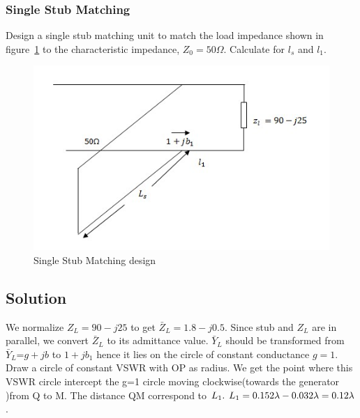 \begin{exmp}
\subsubsection*{Single Stub Matching}
Design a single stub matching unit to match the load impedance shown in figure~\ref{fig:figw} to the characteristic impedance, $Z_0 = 50\varOmega$. Calculate for $l_s$ and $l_1$.
\begin{figure}[h]
\centering
\includegraphics[width=1\linewidth]{./graphics/figw}
\caption{Single Stub Matching design}
\label{fig:figw}
\end{figure}

\subsection*{Solution}
We normalize $Z_L=90-j25$ to get 
$\bar{Z}_L=1.8-j0.5$. Since stub and $Z_L$ are in parallel,
we convert $\bar{Z}_L$ to its admittance value. $\bar{Y}_{L}$
should be transformed from 
$\bar{Y}_{L}$=$g+jb$ to $1+jb_1$ hence it lies on the circle of constant conductance $g=1$. Draw a circle of constant VSWR with OP as radius. We get the point where this VSWR circle intercept the g=1 circle moving clockwise(towards the generator )from Q to M. The distance QM correspond to $L_1.\hspace{0.15cm} L_1=0.152\lambda-0.032\lambda=0.12\lambda$.


\end{exmp}
